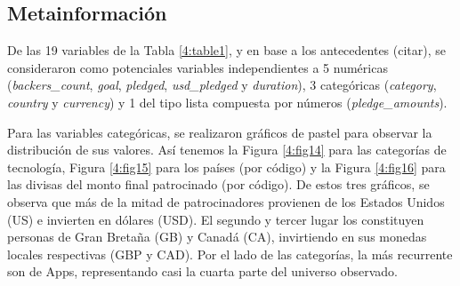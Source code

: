 \subsection{Metainformación}
De las 19 variables de la Tabla \ref{4:table1}, y en base a los antecedentes (citar), se consideraron como potenciales variables independientes a 5 numéricas (\textit{backers\_count}, \textit{goal}, \textit{pledged}, \textit{usd\_pledged} y \textit{duration}), 3 categóricas (\textit{category}, \textit{country} y \textit{currency}) y 1 del tipo lista compuesta por números (\textit{pledge\_amounts}).

Para las variables categóricas, se realizaron gráficos de pastel para observar la distribución de sus valores. Así tenemos la Figura \ref{4:fig14} para las categorías de tecnología, Figura \ref{4:fig15} para los países (por código) y la Figura \ref{4:fig16} para las divisas del monto final patrocinado (por código). De estos tres gráficos, se observa que más de la mitad de patrocinadores provienen de los Estados Unidos (US) e invierten en dólares (USD). El segundo y tercer lugar los constituyen personas de Gran Bretaña (GB) y Canadá (CA), invirtiendo en sus monedas locales respectivas (GBP y CAD). Por el lado de las categorías, la más recurrente son de Apps, representando casi la cuarta parte del universo observado.

